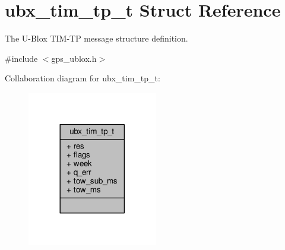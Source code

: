 \hypertarget{structubx__tim__tp__t}{\section{ubx\+\_\+tim\+\_\+tp\+\_\+t Struct Reference}
\label{structubx__tim__tp__t}
}


The U-\/\+Blox T\+I\+M-\/\+T\+P message structure definition.  




{\ttfamily \#include $<$gps\+\_\+ublox.\+h$>$}



Collaboration diagram for ubx\+\_\+tim\+\_\+tp\+\_\+t\+:
\nopagebreak
\begin{figure}[H]
\begin{center}
\leavevmode
\includegraphics[width=161pt]{structubx__tim__tp__t__coll__graph}
\end{center}
\end{figure}
